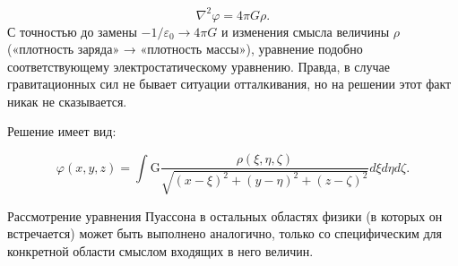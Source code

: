 \begin{equation}
  \nabla^2 \varphi = 4 \pi G \rho.
\end{equation}
С точностью до замены $-1/\varepsilon_0 \rightarrow 4 \pi G$ и изменения смысла величины $\rho$ («плотность заряда»  → «плотность массы»), уравнение подобно соответствующему электростатическому уравнению. Правда, в случае гравитационных сил не бывает ситуации отталкивания, но на решении этот факт никак не сказывается.

Решение имеет вид:

\begin{equation}
  \varphi (x,y,z) = \int \text{G} \frac{\rho(\xi,\eta,\zeta)}{\sqrt{(x-\xi)^2+(y-\eta)^2+(z-\zeta)^2}} d\xi d\eta d\zeta.
\end{equation}

Рассмотрение уравнения Пуассона в остальных областях физики (в которых он встречается) может быть выполнено аналогично, только со специфическим для конкретной области смыслом входящих в него величин.